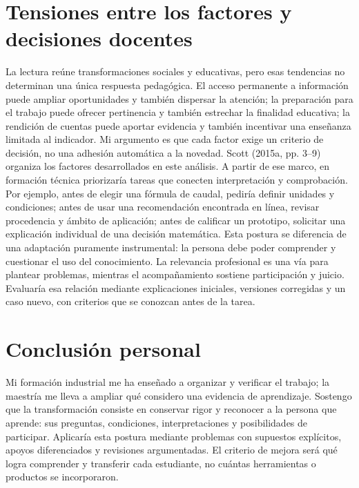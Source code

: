 \documentclass[spanish,letterpaper,oneside]{article}
\begin{document}
\section{Tensiones entre los factores y decisiones docentes}
La lectura reúne transformaciones sociales y educativas, pero esas tendencias no determinan una única respuesta pedagógica. El acceso permanente a información puede ampliar oportunidades y también dispersar la atención; la preparación para el trabajo puede ofrecer pertinencia y también estrechar la finalidad educativa; la rendición de cuentas puede aportar evidencia y también incentivar una enseñanza limitada al indicador. Mi argumento es que cada factor exige un criterio de decisión, no una adhesión automática a la novedad.
Scott (2015a, pp. 3--9) organiza los factores desarrollados en este análisis. A partir de ese marco, en formación técnica priorizaría tareas que conecten interpretación y comprobación. Por ejemplo, antes de elegir una fórmula de caudal, pediría definir unidades y condiciones; antes de usar una recomendación encontrada en línea, revisar procedencia y ámbito de aplicación; antes de calificar un prototipo, solicitar una explicación individual de una decisión matemática.
Esta postura se diferencia de una adaptación puramente instrumental: la persona debe poder comprender y cuestionar el uso del conocimiento. La relevancia profesional es una vía para plantear problemas, mientras el acompañamiento sostiene participación y juicio. Evaluaría esa relación mediante explicaciones iniciales, versiones corregidas y un caso nuevo, con criterios que se conozcan antes de la tarea.

\section{Conclusión personal}
Mi formación industrial me ha enseñado a organizar y verificar el trabajo; la maestría me lleva a ampliar qué considero una evidencia de aprendizaje. Sostengo que la transformación consiste en conservar rigor y reconocer a la persona que aprende: sus preguntas, condiciones, interpretaciones y posibilidades de participar. Aplicaría esta postura mediante problemas con supuestos explícitos, apoyos diferenciados y revisiones argumentadas. El criterio de mejora será qué logra comprender y transferir cada estudiante, no cuántas herramientas o productos se incorporaron.
\end{document}
